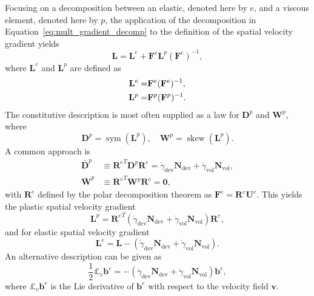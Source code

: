 Focusing on a decomposition between an elastic, denoted here by $e$, and a viscous element, denoted here by $p$, the application of the decomposition in Equation~\eqref{eq:mult_gradient_decomp} to the definition of the spatial velocity gradient yields
\begin{equation}
	\mathbf L = \mathbf L^e + \mathbf F^e \mathbf L^p (\mathbf F^e)^{-1},
\end{equation}
where $\mathbf L^e$ and $\mathbf L^p$ are defined as
\begin{align}
	\mathbf L^e =&  \do{\mathbf F}^e(\mathbf F^e)^{-1},\\
	\mathbf L^p =&  \do{\mathbf F}^p(\mathbf F^p)^{-1}.
\end{align}
The constitutive description is most often supplied as a law for $\mathbf D^p$ and $\mathbf W^p$, where
\begin{equation}
	\mathbf D^p = \operatorname{sym}(\mathbf L^p),\quad \mathbf W^p = \operatorname{skew}(\mathbf L^p).
\end{equation}
A common approach is \citep{desouzanetoComputationalMethodsPlasticity2008}
\begin{align}
  \label{eq:rate_plasticity_de_souza}
	\bar{\mathbf D}^p &\equiv  {\mathbf R^e}^T \mathbf D^p \mathbf R^e  = \dot\gamma_\text{dev} \mathbf N_\text{dev} + \dot\gamma_\text{vol} \mathbf N_\text{vol},\\
	\bar{\mathbf W}^p &\equiv {\mathbf R^e}^T \mathbf W^p \mathbf R^e = \bm 0,
\end{align}
with $\mathbf R^e$ defined by the polar decomposition theorem as $\mathbf F^e = \mathbf R^e\mathbf U^e$.
This yields the plastic spatial velocity gradient
\begin{equation}
	\mathbf L^p = {\mathbf R^e}^T(\dot\gamma_\text{dev} \mathbf N_\text{dev} + \dot\gamma_\text{vol} \mathbf N_\text{vol})\mathbf R^e,
\end{equation}
and for elastic spatial velocity gradient
\begin{equation}
	\mathbf L^e = \mathbf L - (\dot\gamma_\text{dev} \mathbf N_\text{dev} + \dot\gamma_\text{vol} \mathbf N_\text{vol}).
\end{equation}
An alternative description can be given as
\begin{equation}
  \label{eq:flow_rule_lie_derivative}
	\frac{1}{2}£_v \mathbf b^e = -(\dot\gamma_\text{dev} \mathbf N_\text{dev} + \dot\gamma_\text{vol} \mathbf N_\text{vol})\mathbf b^e,
\end{equation}
where $£_v \mathbf b^e$ is the Lie derivative of $\mathbf b^e$ with respect to the velocity field $\bm v$.

